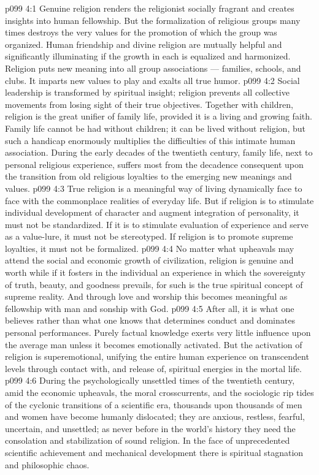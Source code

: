 \vs p099 4:1 Genuine religion renders the religionist socially fragrant and creates insights into human fellowship. But the formalization of religious groups many times destroys the very values for the promotion of which the group was organized. Human friendship and divine religion are mutually helpful and significantly illuminating if the growth in each is equalized and harmonized. Religion puts new meaning into all group associations --- families, schools, and clubs. It imparts new values to play and exalts all true humor.
\vs p099 4:2 Social leadership is transformed by spiritual insight; religion prevents all collective movements from losing sight of their true objectives. Together with children, religion is the great unifier of family life, provided it is a living and growing faith. Family life cannot be had without children; it can be lived without religion, but such a handicap enormously multiplies the difficulties of this intimate human association. During the early decades of the twentieth century, family life, next to personal religious experience, suffers most from the decadence consequent upon the transition from old religious loyalties to the emerging new meanings and values.
\vs p099 4:3 \pc True religion is a meaningful way of living dynamically face to face with the commonplace realities of everyday life. But if religion is to stimulate individual development of character and augment integration of personality, it must not be standardized. If it is to stimulate evaluation of experience and serve as a value\hyp{}lure, it must not be stereotyped. If religion is to promote supreme loyalties, it must not be formalized.
\vs p099 4:4 No matter what upheavals may attend the social and economic growth of civilization, religion is genuine and worth while if it fosters in the individual an experience in which the sovereignty of truth, beauty, and goodness prevails, for such is the true spiritual concept of supreme reality. And through love and worship this becomes meaningful as fellowship with man and sonship with God.
\vs p099 4:5 After all, it is what one believes rather than what one knows that determines conduct and dominates personal performances. Purely factual knowledge exerts very little influence upon the average man unless it becomes emotionally activated. But the activation of religion is superemotional, unifying the entire human experience on transcendent levels through contact with, and release of, spiritual energies in the mortal life.
\vs p099 4:6 \pc During the psychologically unsettled times of the twentieth century, amid the economic upheavals, the moral crosscurrents, and the sociologic rip tides of the cyclonic transitions of a scientific era, thousands upon thousands of men and women have become humanly dislocated; they are anxious, restless, fearful, uncertain, and unsettled; as never before in the world’s history they need the consolation and stabilization of sound religion. In the face of unprecedented scientific achievement and mechanical development there is spiritual stagnation and philosophic chaos.
